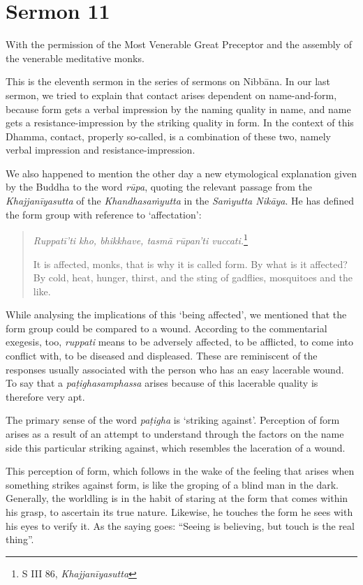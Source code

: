 \chapter{Sermon 11}

\NibbanaOpeningQuote

With the permission of the Most Venerable Great Preceptor and the assembly of the venerable meditative monks.

This is the eleventh sermon in the series of sermons on Nibbāna. In our last sermon, we tried to explain that contact arises dependent on name-and-form, because form gets a verbal impression by the naming quality in name, and name gets a resistance-impression by the striking quality in form. In the context of this Dhamma, contact, properly so-called, is a combination of these two, namely verbal impression and resistance-impression.

We also happened to mention the other day a new etymological explanation given by the Buddha to the word \emph{rūpa}, quoting the relevant passage from the \emph{Khajjanīyasutta} of the \emph{Khandhasaṁyutta} in the \emph{Saṁyutta Nikāya}. He has defined the form group with reference to `affectation':

\begin{quote}
\emph{Ruppatī'ti kho, bhikkhave, tasmā rūpan'ti vuccati.}\footnote{S III 86, \emph{Khajjanīyasutta}}

It is affected, monks, that is why it is called form. By what is it affected? By cold, heat, hunger, thirst, and the sting of gadflies, mosquitoes and the like.
\end{quote}

While analysing the implications of this `being affected', we mentioned that the form group could be compared to a wound. According to the commentarial exegesis, too, \emph{ruppati} means to be adversely affected, to be afflicted, to come into conflict with, to be diseased and displeased. These are reminiscent of the responses usually associated with the person who has an easy lacerable wound. To say that a \emph{paṭighasamphassa} arises because of this lacerable quality is therefore very apt.

The primary sense of the word \emph{paṭigha} is `striking against'. Perception of form arises as a result of an attempt to understand through the factors on the name side this particular striking against, which resembles the laceration of a wound.

This perception of form, which follows in the wake of the feeling that arises when something strikes against form, is like the groping of a blind man in the dark. Generally, the worldling is in the habit of staring at the form that comes within his grasp, to ascertain its true nature. Likewise, he touches the form he sees with his eyes to verify it. As the saying goes: ``Seeing is believing, but touch is the real thing''.

